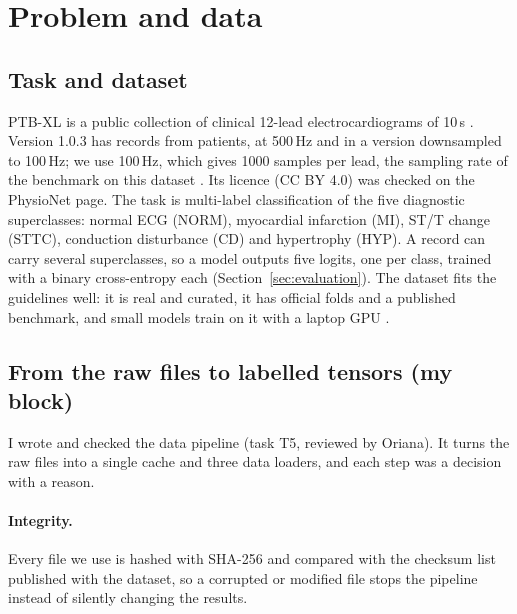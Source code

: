 \section{Problem and data}\label{sec:data}

\subsection{Task and dataset}

PTB-XL is a public collection of clinical 12-lead electrocardiograms of 10\,s
\cite{wagner2020ptbxl,ptbxl_physionet,pollard2026physionet}. Version 1.0.3 has \edaNRecordsAll{} records from
\edaNPatientsAll{} patients, at 500\,Hz and in a version downsampled to 100\,Hz; we use 100\,Hz, which
gives 1000 samples per lead, the sampling rate of the benchmark on this dataset
\cite[p.~1520]{strodthoff2021deep}. Its licence (CC BY 4.0) was checked on the PhysioNet page. The task is
multi-label classification of the five diagnostic superclasses: normal ECG (NORM), myocardial
infarction (MI), ST/T change (STTC), conduction disturbance (CD) and hypertrophy (HYP). A record can
carry several superclasses, so a model outputs five logits, one per class, trained with a binary
cross-entropy each (Section~\ref{sec:evaluation}). The dataset fits the guidelines well: it is real and
curated, it has official folds and a published benchmark, and small models train on it with a laptop
GPU \cite{course_message_2011}.

\subsection{From the raw files to labelled tensors (my block)}

I wrote and checked the data pipeline (task T5, reviewed by Oriana). It turns the raw files into a
single cache and three data loaders, and each step was a decision with a reason.

\paragraph{Integrity.} Every file we use is hashed with SHA-256 and compared with the checksum list
published with the dataset, so a corrupted or modified file stops the pipeline instead of silently
changing the results.

